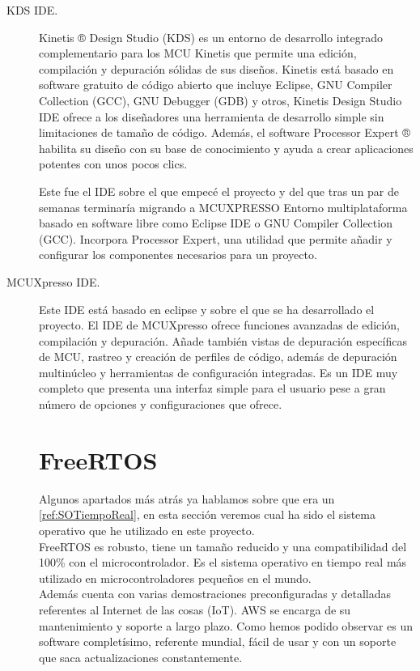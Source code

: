 \begin{description}
\item[KDS IDE.]
Kinetis ® Design Studio (KDS) es un entorno de desarrollo integrado complementario para los MCU Kinetis que permite una edición, compilación y depuración sólidas de sus diseños.
Kinetis está basado en software gratuito de código abierto que incluye Eclipse, GNU Compiler Collection (GCC), GNU Debugger (GDB) y otros, Kinetis Design Studio IDE ofrece a los diseñadores una herramienta de desarrollo simple sin limitaciones de tamaño de código. 
Además, el software Processor Expert ® habilita su diseño con su base de conocimiento y ayuda a crear aplicaciones potentes con unos pocos clics.

Este fue el IDE sobre el que empecé el proyecto y del que tras un par de semanas terminaría migrando a MCUXPRESSO 
Entorno multiplataforma basado en software libre como Eclipse IDE o GNU Compiler Collection (GCC). Incorpora Processor Expert, una utilidad que permite añadir y configurar los componentes necesarios para un proyecto.


\item[MCUXpresso IDE.]
Este IDE está basado en eclipse y sobre el que se ha desarrollado el proyecto. 
El IDE de MCUXpresso \cite{MCUXDownload} ofrece funciones avanzadas de edición, compilación y depuración. Añade también vistas de depuración específicas de MCU, rastreo y creación de perfiles de código, además de depuración multinúcleo y herramientas de configuración integradas. Es un IDE muy completo que presenta una interfaz simple para el usuario pese a gran número de opciones y configuraciones que ofrece.

\section{FreeRTOS}\label{sec:RTOS}
Algunos apartados más atrás ya hablamos sobre que era un  \ref{ref:SOTiempoReal}, en esta sección veremos cual ha sido el sistema operativo que he utilizado en este proyecto. \\
FreeRTOS \cite{web:FreeRtos} es robusto, tiene un tamaño reducido y  una compatibilidad del 100\% con el microcontrolador. Es el sistema operativo en tiempo real más utilizado en microcontroladores pequeños en el mundo.\\
Además cuenta con varias demostraciones preconfiguradas y detalladas referentes al Internet de las cosas (IoT). AWS se encarga de su mantenimiento y soporte a largo plazo.
Como hemos podido observar es un software completísimo, referente mundial, fácil de usar y con un soporte que saca actualizaciones constantemente.



\end{description}
